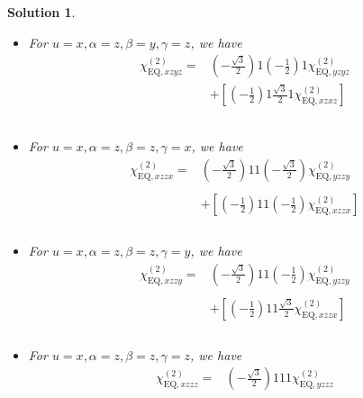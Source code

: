 \documentclass[UTF8,10pt,a4paper]{article}
\theoremstyle{Problem}
\theoremstyle{Solution}
\newtheorem*{sol}{Solution}
\begin{document}
\begin{sol}
\begin{itemize}
\begin{align}
\nonumber&+\left[\left(-\frac{\sqrt{3}}{2}\right)1\frac{\sqrt{3}}{2}\frac{\sqrt{3}}{2}\chi_{\text{EQ},yzxx}^{(2)}\right]\\
&
\end{align}\normalsize
\item For $u=x,\alpha=z,\beta=y,\gamma=z$, we have
\footnotesize\begin{align}
\nonumber\chi_{\text{EQ},xzyz}^{(2)}=&\left(-\frac{\sqrt{3}}{2}\right)1\left(-\frac{1}{2}\right)1\chi_{\text{EQ},yzyz}^{(2)}\\
\nonumber&+\left[\left(-\frac{1}{2}\right)1\frac{\sqrt{3}}{2}1\chi_{\text{EQ},xzxz}^{(2)}\right]\\
\nonumber&\\
\nonumber&\\
&
\end{align}\normalsize
\item For $u=x,\alpha=z,\beta=z,\gamma=x$, we have
\footnotesize\begin{align}
\nonumber\chi_{\text{EQ},xzzx}^{(2)}=&\left(-\frac{\sqrt{3}}{2}\right)11\left(-\frac{\sqrt{3}}{2}\right)\chi_{\text{EQ},yzzy}^{(2)}\\
\nonumber&\\
\nonumber&+\left[\left(-\frac{1}{2}\right)11\left(-\frac{1}{2}\right)\chi_{\text{EQ},xzzx}^{(2)}\right]\\
\nonumber&\\
&
\end{align}\normalsize
\item For $u=x,\alpha=z,\beta=z,\gamma=y$, we have
\footnotesize\begin{align}
\nonumber\chi_{\text{EQ},xzzy}^{(2)}=&\left(-\frac{\sqrt{3}}{2}\right)11\left(-\frac{1}{2}\right)\chi_{\text{EQ},yzzy}^{(2)}\\
\nonumber&\\
\nonumber&+\left[\left(-\frac{1}{2}\right)11\frac{\sqrt{3}}{2}\chi_{\text{EQ},xzzx}^{(2)}\right]\\
\nonumber&\\
&
\end{align}\normalsize
\item For $u=x,\alpha=z,\beta=z,\gamma=z$, we have
\footnotesize\begin{align}
\nonumber\chi_{\text{EQ},xzzz}^{(2)}=&\left(-\frac{\sqrt{3}}{2}\right)111\chi_{\text{EQ},yzzz}^{(2)}\\
\nonumber&\\
\nonumber&\\
\nonumber&\\

\end{align}
\end{itemize}
\end{sol}
\end{document}
